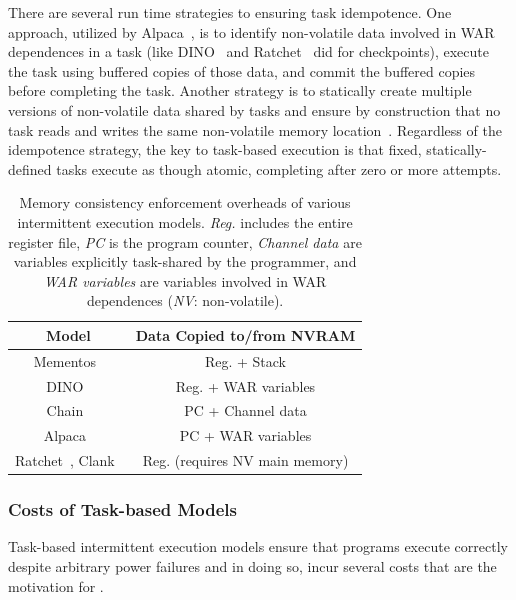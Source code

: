 There are several run time strategies to ensuring task idempotence. One approach, utilized by Alpaca~\cite{alpaca}, is to identify non-volatile data involved in WAR dependences in a task (like DINO~\cite{dino} and Ratchet~\cite{ratchet} did for checkpoints), execute the task using buffered copies of those data, and commit the buffered copies before completing the task. Another strategy is to statically create multiple versions of non-volatile data shared by tasks and ensure by construction that no task reads and writes the same non-volatile memory location~\cite{chain}. Regardless of the idempotence strategy, the key to task-based execution is that fixed, statically-defined tasks execute as though atomic, completing after zero or more attempts. 

\begin{table}
	\centering
	\footnotesize
	\begin{tabular}{|c|c|}
		\hline
		Model & Data Copied to/from NVRAM \\
		\hline\hline
		Mementos~\cite{mementos}                             & Reg. + Stack     \\
		DINO~\cite{dino}                                     & Reg. + WAR variables \\
		Chain~\cite{chain}                                   & PC   + Channel data\\
		Alpaca~\cite{alpaca}                                 & PC   + WAR variables \\
		Ratchet~\cite{ratchet}, Clank~\cite{hicks_isca_2017} & Reg. (requires NV main memory) \\
		\hline
	\end{tabular}
	\caption{Memory consistency enforcement overheads of various intermittent execution models. \emph{Reg.} includes the entire register file, \emph{PC} is the program counter, \emph{Channel data} are variables explicitly task-shared by the programmer, and \emph{WAR variables} are variables involved in WAR dependences (\emph{NV}: non-volatile).}
	\label{table:chechpoint_comparison}
\end{table}

\subsubsection{Costs of Task-based Models}

Task-based intermittent execution models ensure that programs execute correctly despite arbitrary power failures and in doing so, incur several costs that are the motivation for \sys. 

